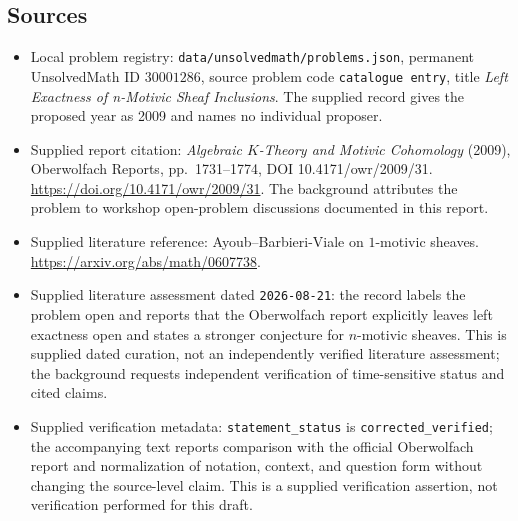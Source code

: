 \documentclass[11pt]{article}
\begin{document}
\subsection{Sources}
\begin{itemize}
\item Local problem registry: \texttt{data/unsolvedmath/problems.json}, permanent UnsolvedMath ID \(30001286\), source problem code \texttt{catalogue entry}, title \emph{Left Exactness of n-Motivic Sheaf Inclusions}. The supplied record gives the proposed year as 2009 and names no individual proposer.
\item Supplied report citation: \emph{Algebraic \(K\)-Theory and Motivic Cohomology} (2009), Oberwolfach Reports, pp.\ 1731--1774, DOI 10.4171/owr/2009/31. \url{https://doi.org/10.4171/owr/2009/31}. The background attributes the problem to workshop open-problem discussions documented in this report.
\item Supplied literature reference: Ayoub--Barbieri-Viale on \(1\)-motivic sheaves. \url{https://arxiv.org/abs/math/0607738}.
\item Supplied literature assessment dated \texttt{2026-08-21}: the record labels the problem open and reports that the Oberwolfach report explicitly leaves left exactness open and states a stronger conjecture for \(n\)-motivic sheaves. This is supplied dated curation, not an independently verified literature assessment; the background requests independent verification of time-sensitive status and cited claims.
\item Supplied verification metadata: \texttt{statement\_status} is \texttt{corrected\_verified}; the accompanying text reports comparison with the official Oberwolfach report and normalization of notation, context, and question form without changing the source-level claim. This is a supplied verification assertion, not verification performed for this draft.
\end{itemize}
\end{document}
